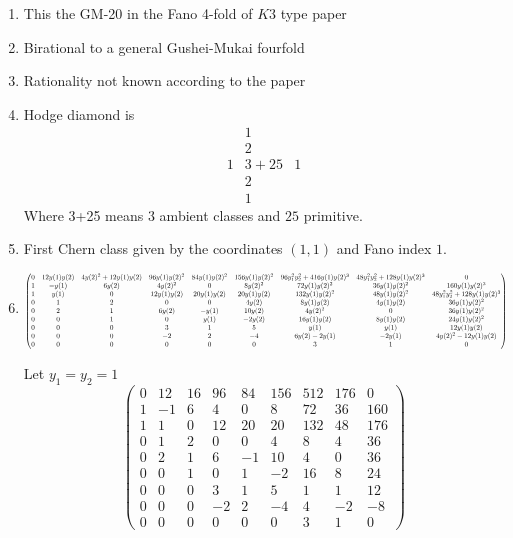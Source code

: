 \documentclass[11pt]{amsart}
\newcounter{num}[section] %
\begin{document}
\begin{enumerate}
    \item [1)] This the GM-20 in the Fano 4-fold of $K3$ type paper
    \item[2)]Birational to a general Gushei-Mukai fourfold
    \item[3)] Rationality not known according to the paper
    \item[4)] Hodge diamond is 
    \[
        \begin{array}{ccc}
             &1&  \\
             &2&\\
           1&3+25&1\\
            &2&\\
            &1&
        \end{array}
    \]
    Where 3+25 means $3$ ambient classes and $25$ primitive. 
\item[5)] First Chern class given by the coordinates $(1,1)$ and Fano index $1$. 

    \item[6)]

    \[
    \resizebox{\textwidth}{!}{$
\begin{pmatrix}
0 & 12y(1)y(2) & 4y(2)^2+12y(1)y(2) & 96y(1)y(2)^2 & 84y(1)y(2)^2 & 156y(1)y(2)^2 & 96y_{1}^{2}y_{2}^{2} +416 y(1) y(2)^3& 48y_{1}^{2}y_{2}^{2} +128 y(1) y(2)^3& 0 \\
1 & -y(1) & 6y(2) & 4y(2)^2 & 0 & 8y(2)^2 & 72y(1)y(2)^2 & 36y(1)y(2)^2 & 160 y(1) y(2)^3\\
1 & y(1) & 0 & 12y(1)y(2) & 20y(1)y(2) & 20y(1)y(2) & 132y(1)y(2)^2 & 48y(1)y(2)^2 & 48y_{1}^{2}y_{2}^{2} +128 y(1) y(2)^3\\
0 & 1 & 2 & 0 & 0 & 4y(2) & 8y(1)y(2) & 4y(1)y(2) & 36y(1)y(2)^2 \\
0 & 2 & 1 & 6y(2) & -y(1) & 10y(2) & 4y(2)^2 & 0 & 36y(1)y(2)^2 \\
0 & 0 & 1 & 0 & y(1) & -2y(2) & 16y(1)y(2) & 8y(1)y(2) & 24y(1)y(2)^2 \\
0 & 0 & 0 & 3 & 1 & 5 & y(1) & y(1) & 12y(1)y(2) \\
0 & 0 & 0 & -2 & 2 & -4 & 6y(2)-2y(1) & -2y(1) & 4y(2)^2-12y(1)y(2) \\
0 & 0 & 0 & 0 & 0 & 0 & 3 & 1 & 0
\end{pmatrix}
$}
\]

Let $y_1 = y_2 =1$
$$ 
\begin{pmatrix}
0 & 12 & 16 & 96 & 84 & 156 & 512 & 176 & 0 \\
1 & -1 & 6 & 4 & 0 & 8 & 72 & 36 & 160 \\
1 & 1 & 0 & 12 & 20 & 20 & 132 & 48 & 176 \\
0 & 1 & 2 & 0 & 0 & 4 & 8 & 4 & 36 \\
0 & 2 & 1 & 6 & -1 & 10 & 4 & 0 & 36 \\
0 & 0 & 1 & 0 & 1 & -2 & 16 & 8 & 24 \\
0 & 0 & 0 & 3 & 1 & 5 & 1 & 1 & 12 \\
0 & 0 & 0 & -2 & 2 & -4 & 4 & -2 & -8 \\
0 & 0 & 0 & 0 & 0 & 0 & 3 & 1 & 0
\end{pmatrix}
$$
\end{enumerate}
\end{document}
